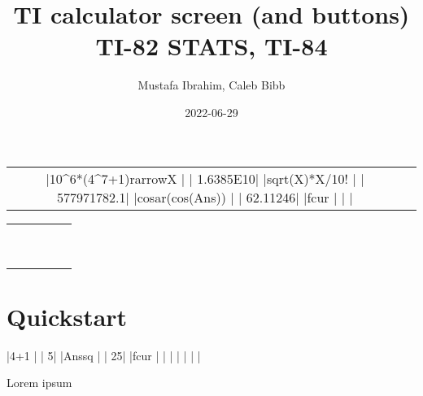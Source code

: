 \documentclass[a4paper,12pt]{article}
\title{TI calculator screen (and buttons)\\{\small TI-82 STATS, TI-84}}
\author{Mustafa Ibrahim, Caleb Bibb}
\date{2022-06-29}
\begin{document}
\maketitle

\begin{center}
	\begin{tabular}{cc}
		\tiscreen
		|10^6*(4^7+1){rarrow}X  |
		|       1.6385E10|
		|{sqrt}(X)*X/10!      |
		|     577971782.1|
		|cos{ar}(cos(Ans))  |
		|        62.11246|
		|{fcur}               |
		|                |
		&
		\tibtnextramatrix
	\end{tabular}

	\dotfill

	\begin{tabular}{ccccc}
		\tibtnsecond & \tibtnmode   & \tibtndel       &                  &             \\
		\tibtnalpha  & \tibtnxton   & \tibtnstat      &                  &             \\
		\tibtnmath   & \tibtnmatrix & \tibtnprgm      & \tibtnvars       & \tibtnclear \\
		\tibtnxnone  & \tibtnsin    & \tibtncos       & \tibtntan        & \tibtnpower \\
		\tibtnxtwo   & \tibtncomma  & \tibtnleftparen & \tibtnrightparen & \tibtndiv   \\
		\tibtnlog    & \tibtnseven  & \tibtneight     & \tibtnnine       & \tibtntimes \\
		\tibtnln     & \tibtnfour   & \tibtnfive      & \tibtnsix        & \tibtnminus \\
		\tibtnsto    & \tibtnone    & \tibtntwo       & \tibtnthree      & \tibtnplus  \\
		\tibtnon     & \tibtnzero   & \tibtndot       & \tibtnneg        & \tibtnenter \\
	\end{tabular}
\end{center}

\newpage\tableofcontents\newpage

\section{Quickstart}

\begin{SideBySideExample}[xrightmargin=5.5cm]

\tiscreen
|4+1             |
|               5|
|Ans{sq}         |
|              25|
|{fcur}          |
|                |
|                |
|                |

Lorem \tibtnmath{} ipsum

\tibtnextramath
\end{SideBySideExample}
\end{document}
